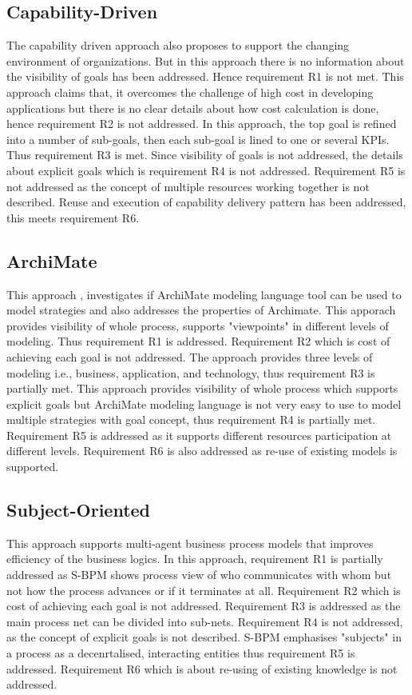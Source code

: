 \subsection{Capability-Driven} 
The capability driven approach \cite{Stirna2012} also proposes to support the changing environment of organizations. But in this approach there is no information about the visibility of goals has been addressed. Hence requirement R1 is not met. This approach claims that, it overcomes the challenge of high cost in developing applications but there is no clear details about how cost calculation is done, hence requirement R2 is not addressed. In this approach, the top goal is refined into a number of sub-goals, then each sub-goal is lined to one or several KPIs. Thus requirement R3 is met. Since visibility of goals is not addressed, the details about explicit goals which is requirement R4 is not addressed. Requirement R5 is not addressed as the concept of multiple resources working together is not described. Reuse and execution of capability delivery pattern has been addressed, this meets requirement R6. 

\subsection{ArchiMate} 
This approach \cite{Aldea2015}, investigates if ArchiMate modeling language tool can be used to model strategies and also addresses the properties of Archimate. This apporach provides visibility of whole process, supports "viewpoints" in different levels of modeling. Thus requirement R1 is addressed. Requirement R2 which is cost of achieving each goal is not addressed. The approach provides three levels of modeling i.e., business, application, and technology, thus requirement R3 is partially met. This approach provides visibility of whole process which supports explicit goals but ArchiMate modeling language is not very easy to use to model multiple strategies with goal concept, thus requirement R4 is partially met. Requirement R5 is addressed as it supports different resources participation at different levels. Requirement R6 is also addressed as re-use of existing models is supported. 

\subsection{Subject-Oriented} 
This approach \cite{Fleischmann2013} supports multi-agent business process models that improves efficiency of the business logics. In this approach, requirement R1 is partially addressed  as S-BPM shows process view of who communicates with whom but not how the process advances or if it terminates at all. Requirement R2 which is cost of achieving each goal is not addressed. Requirement R3 is addressed as the main process net can be divided into sub-nets. Requirement R4 is not addressed, as the concept of explicit goals is not described. S-BPM emphasises "subjects" in a process as a decenrtalised, interacting entities thus requirement R5 is addressed. Requirement R6 which is about re-using of existing knowledge is not addressed. 

